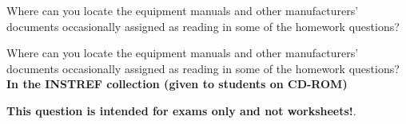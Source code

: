 

Where can you locate the equipment manuals and other manufacturers' documents occasionally assigned as reading in some of the homework questions?







Where can you locate the equipment manuals and other manufacturers' documents occasionally assigned as reading in some of the homework questions? {\bf In the INSTREF collection (given to students on CD-ROM)}







{\bf This question is intended for exams only and not worksheets!}.



